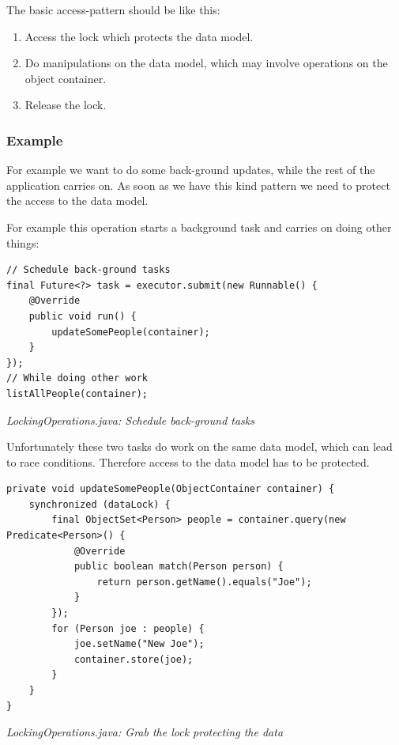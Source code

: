 The basic access-pattern should be like this:

\begin{enumerate}
\item Access the lock which protects the data model.
\item Do manipulations on the data model, which may involve operations on the object container.
\item Release the lock.
\end{enumerate}

\subsubsection{Example}
\label{ref:advanced-topics-concurrency-share-object-container-threads:example}

For example we want to do some back-ground updates, while the rest of the application carries on. As soon as we have this kind pattern we need to protect the access to the data model.

For example this operation starts a background task and carries on doing other things:

\begin{lstlisting}
// Schedule back-ground tasks
final Future<?> task = executor.submit(new Runnable() {
    @Override
    public void run() {
        updateSomePeople(container);
    }
});
// While doing other work
listAllPeople(container);
\end{lstlisting}

{\small\itshape LockingOperations.java: Schedule back-ground tasks\par}
\medskip

Unfortunately these two tasks do work on the same data model, which can lead to race conditions. Therefore access to the data model has to be protected.

\begin{lstlisting}
private void updateSomePeople(ObjectContainer container) {
    synchronized (dataLock) {
        final ObjectSet<Person> people = container.query(new Predicate<Person>() {
            @Override
            public boolean match(Person person) {
                return person.getName().equals("Joe");
            }
        });
        for (Person joe : people) {
            joe.setName("New Joe");
            container.store(joe);
        }
    }
}
\end{lstlisting}

{\small\itshape LockingOperations.java: Grab the lock protecting the data\par}
\medskip

